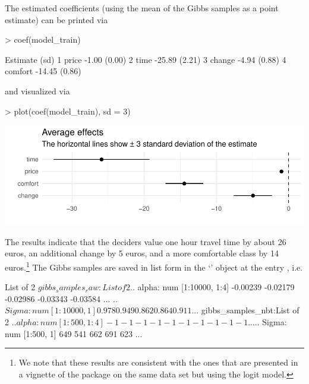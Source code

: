\documentclass[article]{jss}
\newcommand{\class}[1]{`\code{#1}'}
\begin{document}
The estimated coefficients (using the mean of the Gibbs samples as a point estimate) can be printed via

\begin{Schunk}
\begin{Sinput}
> coef(model_train)
\end{Sinput}
\begin{Soutput}
           Estimate   (sd)
1   price     -1.00 (0.00)
2    time    -25.89 (2.21)
3  change     -4.94 (0.88)
4 comfort    -14.45 (0.86)
\end{Soutput}
\end{Schunk}

and visualized via

\begin{Schunk}
\begin{Sinput}
> plot(coef(model_train), sd = 3)
\end{Sinput}
\end{Schunk}
\includegraphics{rprobitb_oelschlaeger_bauer-coef-model-train}

The results indicate that the deciders value one hour travel time by about 26 euros, an additional change by 5 euros, and a more comfortable class by 14 euros.\footnote{We note that these results are consistent with the ones that are presented in a vignette of the  package on the same data set but using the logit model.} The Gibbs samples are saved in list form in the \class{RprobitB\_fit} object at the entry , i.e.

\begin{Schunk}
\begin{Soutput}
List of 2
 $ gibbs_samples_raw:List of 2
  ..$ alpha: num [1:10000, 1:4] -0.00239 -0.02179 -0.02986 -0.03343 -0.03584 ...
  ..$ Sigma: num [1:10000, 1] 0.978 0.949 0.862 0.864 0.911 ...
 $ gibbs_samples_nbt:List of 2
  ..$ alpha: num [1:500, 1:4] -1 -1 -1 -1 -1 -1 -1 -1 -1 -1 ...
  ..$ Sigma: num [1:500, 1] 649 541 662 691 623 ...
\end{Soutput}
\end{Schunk}
\end{document}
